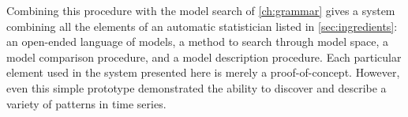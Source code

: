 Combining this procedure with the model search of \cref{ch:grammar} gives a system combining all the elements of an automatic statistician listed in \cref{sec:ingredients}:
an open-ended language of models, a method to search through model space, a model comparison procedure, and a model description procedure.
Each particular element used in the system presented here is merely a proof-of-concept.
However, even this simple prototype demonstrated the ability to discover and describe a variety of patterns in time series.







\outbpdocument{


}


